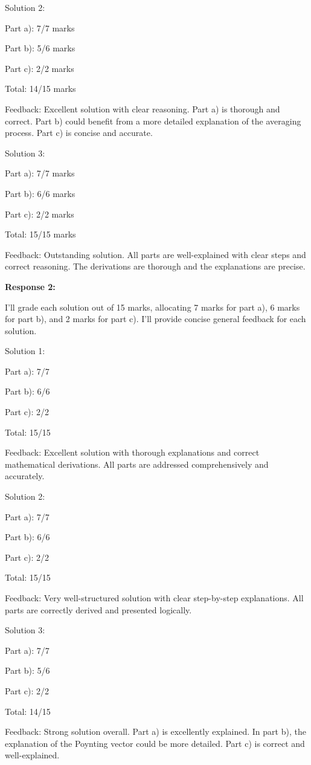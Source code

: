 \documentclass[a4paper,11pt]{article}
\begin{document}
Solution 2:

Part a): 7/7 marks

Part b): 5/6 marks

Part c): 2/2 marks

Total: 14/15 marks

Feedback: Excellent solution with clear reasoning. Part a) is thorough and correct. Part b) could benefit from a more detailed explanation of the averaging process. Part c) is concise and accurate.

Solution 3:

Part a): 7/7 marks

Part b): 6/6 marks

Part c): 2/2 marks

Total: 15/15 marks

Feedback: Outstanding solution. All parts are well-explained with clear steps and correct reasoning. The derivations are thorough and the explanations are precise.

\bigskip
\textbf{Response 2:}

I'll grade each solution out of 15 marks, allocating 7 marks for part a), 6 marks for part b), and 2 marks for part c). I'll provide concise general feedback for each solution.

Solution 1:

Part a): 7/7

Part b): 6/6

Part c): 2/2

Total: 15/15

Feedback: Excellent solution with thorough explanations and correct mathematical derivations. All parts are addressed comprehensively and accurately.

Solution 2:

Part a): 7/7

Part b): 6/6

Part c): 2/2

Total: 15/15

Feedback: Very well-structured solution with clear step-by-step explanations. All parts are correctly derived and presented logically.

Solution 3:

Part a): 7/7

Part b): 5/6

Part c): 2/2

Total: 14/15

Feedback: Strong solution overall. Part a) is excellently explained. In part b), the explanation of the Poynting vector could be more detailed. Part c) is correct and well-explained.
\end{document}
